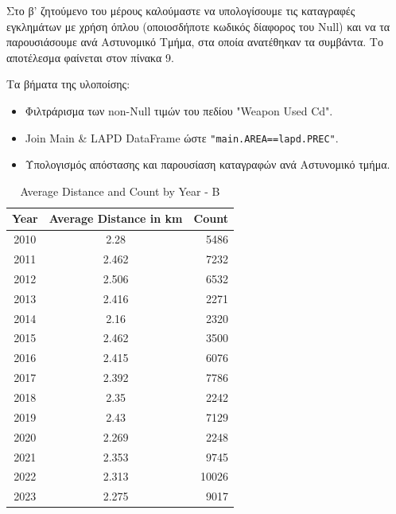 \documentclass{article}
\begin{document}
Στο β' ζητούμενο του μέρους καλούμαστε να υπολογίσουμε τις καταγραφές εγκλημάτων με χρήση όπλου (οποιοσδήποτε κωδικός δίαφορος του Null) και να τα παρουσιάσουμε ανά Αστυνομικό Τμήμα, στα οποία ανατέθηκαν τα συμβάντα. Το αποτέλεσμα φαίνεται στον πίνακα 9. 

\clearpage
Τα βήματα της υλοποίσης:
\begin{itemize}
    \item   Φιλτράρισμα των  non-Null  τιμών του πεδίου  "Weapon Used Cd".
    \item   Join Main \& LAPD DataFrame  ώστε  \texttt{"main.AREA==lapd.PREC"}.
    \item   {}Υπολογισμός απόστασης και παρουσίαση καταγραφών ανά Αστυνομικό τμήμα.
\end{itemize}


\begin{table}[ht]
\centering
\begin{tabular}{|c|c|r|}
\hline
Year & Average Distance in km & Count \\ \hline
2010 & 2.28   & 5486  \\ \hline
2011 & 2.462  & 7232  \\ \hline
2012 & 2.506  & 6532  \\ \hline
2013 & 2.416  & 2271  \\ \hline
2014 & 2.16   & 2320  \\ \hline
2015 & 2.462  & 3500  \\ \hline
2016 & 2.415  & 6076  \\ \hline
2017 & 2.392  & 7786  \\ \hline
2018 & 2.35   & 2242  \\ \hline
2019 & 2.43   & 7129  \\ \hline
2020 & 2.269  & 2248  \\ \hline
2021 & 2.353  & 9745  \\ \hline
2022 & 2.313  & 10026 \\ \hline
2023 & 2.275  & 9017  \\ \hline
\end{tabular}
\caption{Average Distance and Count by Year - B}
\label{table:year_distance_count_b}
\end{table}
\end{document}
